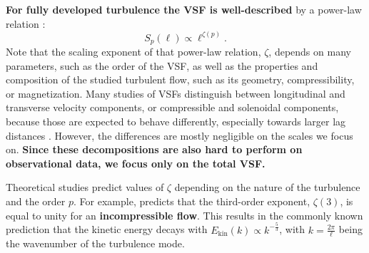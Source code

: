 \textbf{For fully developed turbulence the VSF is well-described} by a power-law relation \citep{Kolmogorov1941,She1994,Boldyrev2002}:
\begin{equation}
	\mathit{S}_p (\ell) \propto \ell^{\zeta(p)}.
    \label{equ:method:propto_zeta}
\end{equation}
Note that the scaling exponent of that power-law relation, $\zeta$, depends on many parameters, such as the order of the VSF, as well as the properties and composition of the studied turbulent flow, such as its geometry, compressibility, or magnetization.
Many studies of VSFs distinguish between longitudinal and transverse velocity components, or compressible and solenoidal components, because those are expected to behave differently, especially towards larger lag distances \citep{Gotoh2002,Schmidt2008,Benzi2010}.
However, the differences are mostly negligible on the scales we focus on. 
\textbf{Since these decompositions are also hard to perform on observational data, we focus only on the total VSF.}

Theoretical studies predict values of $\zeta$ depending on the nature of the turbulence and the order $p$.
For example, \citet{Kolmogorov1941} predicts that the third-order exponent, $\zeta(3)$, is equal to unity for an \textbf{incompressible flow}.
This results in the commonly known prediction that the kinetic energy decays with $E_{\mathrm{kin}}(k) \propto k^{-\frac{5}{3}}$, with $k = \frac{2 \pi}{\ell}$ being the wavenumber of the turbulence mode.

